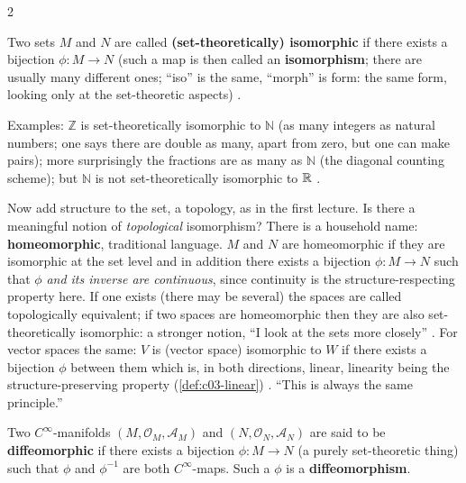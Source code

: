 \begin{paracol}{2}
\begin{definition}\label{def:c04-setiso}
Two sets $M$ and $N$ are called \textbf{(set-theoretically) isomorphic} if there exists a bijection $\phi\colon M\to N$ (such a map is then called an \textbf{isomorphism}; there are usually many different ones; ``iso'' is the same, ``morph'' is form: the same form, looking only at the set-theoretic aspects)
.
\end{definition}
Examples: $\mathbb Z$ is set-theoretically isomorphic to $\mathbb N$ (as many integers as natural numbers; one says there are double as many, apart from zero, but one can make pairs); more surprisingly the fractions are as many as $\mathbb N$ (the diagonal counting scheme); but $\mathbb N$ is not set-theoretically isomorphic to $\mathbb{R}$
.

Now add structure to the set, a topology, as in the first lecture. Is there a meaningful notion of \emph{topological} isomorphism? There is a household name: \textbf{homeomorphic}, traditional language. $M$ and $N$ are homeomorphic if they are isomorphic at the set level and in addition there exists a bijection $\phi\colon M\to N$ such that
$\phi$ \emph{and its inverse are continuous}, since continuity is the structure-respecting property here. If one exists (there may be several) the spaces are called topologically equivalent; if two spaces are homeomorphic then they are also set-theoretically isomorphic: a stronger notion, ``I look at the sets more closely''
.
For vector spaces the same: $V$ is (vector space) isomorphic to $W$ if there exists a bijection $\phi$ between them which is, in both directions, linear, linearity being the structure-preserving property (\cref{def:c03-linear})
. ``This is always the same principle.''

\begin{definition}\label{def:c04-diffeo}
Two $C^\infty$-manifolds $(M,\mathcal O_M,\mathcal A_M)$ and $(N,\mathcal O_N,\mathcal A_N)$ are said to be \textbf{diffeomorphic} if there exists a bijection $\phi\colon M\to N$ (a purely set-theoretic thing) such that $\phi$ and $\phi^{-1}$ are both $C^\infty$-maps. Such a $\phi$ is a \textbf{diffeomorphism}.


\end{definition}
\end{paracol}
